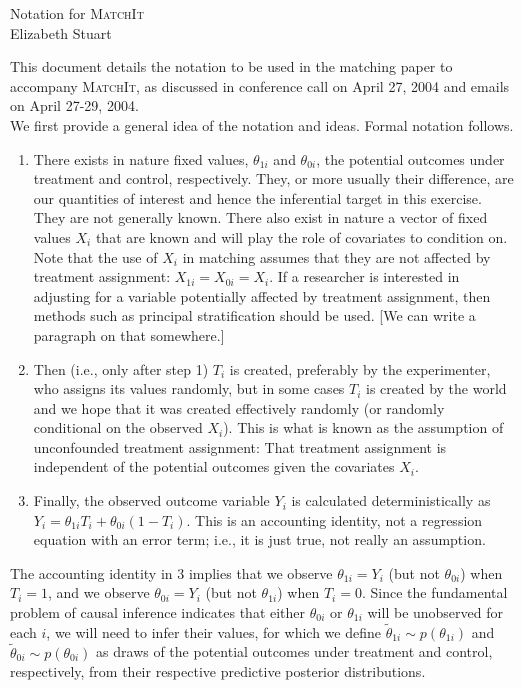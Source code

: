 \documentclass[oneside,letterpaper,titlepage,12pt]{article}
\newcommand{\MatchIt}{\textsc{MatchIt}}
\begin{document}
\begin{center}
Notation for \MatchIt \\
Elizabeth Stuart \\
\end{center}

This document details the notation to be used in the matching paper to accompany \MatchIt,
as discussed in conference call on April 27, 2004 and emails on April 27-29, 2004. \\

We first provide a general idea of the notation and ideas.  Formal notation follows.

\begin{enumerate}
\item  There exists in nature fixed values, $\theta_{1i}$ and $\theta_{0i}$, the
potential outcomes under treatment and control, respectively.  They, or
more usually their difference, are our quantities of interest and hence
the inferential target in this exercise.  They are not generally known.
There also exist in nature a vector of fixed values $X_i$ that are known and
will play the role of covariates to condition on.  Note that the use of $X_i$ in matching assumes that they are not 
affected by treatment assignment: $X_{1i}=X_{0i}=X_i$.  If a researcher is interested in adjusting for a variable potentially affected by treatment
assignment, then methods such as principal stratification should be used. [We can write a paragraph on that somewhere.]

\item  Then (i.e., only after step 1) $T_i$ is created, preferably by the
experimenter, who assigns its values randomly, but in some cases $T_i$ is
created by the world and we hope that it was created effectively randomly
(or randomly conditional on the observed $X_i$).  This is what is known as the assumption of 
unconfounded treatment assignment: That treatment assignment is independent of
the potential outcomes given the covariates $X_i$. 

\item  Finally, the observed outcome variable $Y_i$ is calculated
deterministically as $Y_i = \theta_{1i}T_i + \theta_{0i}(1-T_i)$.  This is
an accounting identity, not a regression equation with an error term;
i.e., it is just true, not really an assumption.
\end{enumerate}

The accounting identity in 3 implies that we observe $\theta_{1i}=Y_i$ (but
not $\theta_{0i}$) when $T_i=1$, and we observe $\theta_{0i}=Y_i$ (but not
$\theta_{1i}$) when $T_i=0$.  Since the fundamental problem of causal
inference indicates that either $\theta_{0i}$ or $\theta_{1i}$ will be
unobserved for each $i$, we will need to infer their values, for which we
define $\tilde\theta_{1i} \sim p(\theta_{1i})$  and $\tilde\theta_{0i} \sim
p(\theta_{0i})$ as draws of the potential outcomes under treatment and
control, respectively, from their respective predictive posterior
distributions.\\
\end{document}

